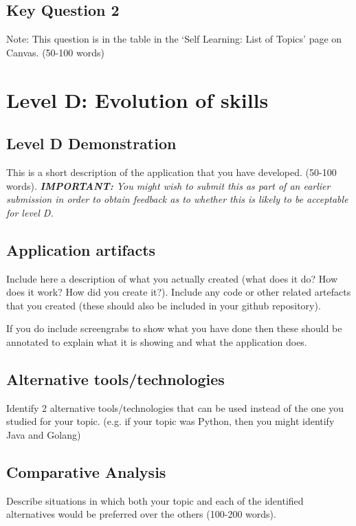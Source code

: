 \documentclass[a4paper, 11pt]{report}
\begin{document}
\subsection{Key Question 2}
Note: This question is in the table in the ‘Self Learning: List of Topics’ page on Canvas. (50-100 words)



\newpage
\section{Level D: Evolution of skills}
\vspace{5mm}
\subsection{Level D Demonstration}

This is a short description of the application that you have developed. (50-100 words).
\textit{{\bf IMPORTANT:} You might wish to submit this as part of an earlier submission in order to obtain feedback as to whether this is likely to be acceptable for level D.}

\subsection{Application artifacts}

Include here a description of what you actually created (what does it do? How does it work? How did you create it?). Include any code or other related artefacts that you created (these should also be included in your github repository).

If you do include screengrabs to show what you have done then these should be annotated to explain what it is showing and what the application does.

\subsection{Alternative tools/technologies}
Identify 2 alternative tools/technologies that can be used instead of the one you studied for your topic. (e.g. if your topic was Python, then you might identify Java and Golang)
\subsection{Comparative Analysis}
Describe situations in which both your topic and each of the identified alternatives would be preferred over the others (100-200 words).




\newpage



\end{document}
